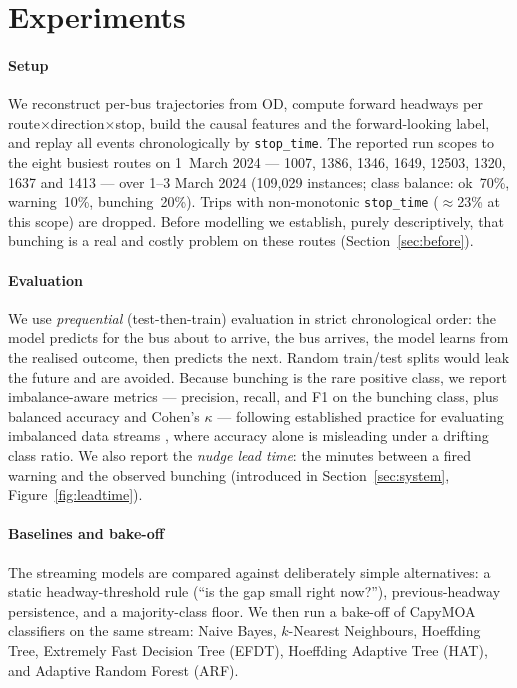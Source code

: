 \documentclass[11pt,a4paper]{article}
\begin{document}
\section{Experiments}
\label{sec:experiments}

\paragraph{Setup}
We reconstruct per-bus trajectories from OD, compute forward headways per
route$\times$direction$\times$stop, build the causal features and the forward-looking label,
and replay all events chronologically by \texttt{stop\_time}. The reported run scopes to the
eight busiest routes on 1~March 2024 --- 1007, 1386, 1346, 1649, 12503, 1320, 1637 and 1413 ---
over 1--3 March 2024 (109{,}029 instances; class balance: ok~70\%, warning~10\%, bunching~20\%).
Trips with non-monotonic \texttt{stop\_time} ($\approx$23\% at this scope) are dropped.
Before modelling we establish, purely descriptively, that bunching is a real and costly problem
on these routes (Section~\ref{sec:before}).

\paragraph{Evaluation}
We use \emph{prequential} (test-then-train) evaluation in strict chronological order: the model
predicts for the bus about to arrive, the bus arrives, the model learns from the realised
outcome, then predicts the next. Random train/test splits would leak the future and are avoided.
Because bunching is the rare positive class, we report imbalance-aware metrics --- precision,
recall, and F1 on the bunching class, plus balanced accuracy and Cohen's $\kappa$ --- following
established practice for evaluating imbalanced data streams \citep{Aguiar2024}, where accuracy
alone is misleading under a drifting class ratio. We also report the
\emph{nudge lead time}: the minutes between a fired warning and the observed bunching
(introduced in Section~\ref{sec:system}, Figure~\ref{fig:leadtime}).

\paragraph{Baselines and bake-off}
The streaming models are compared against deliberately simple alternatives: a static
headway-threshold rule (``is the gap small right now?''), previous-headway persistence, and a
majority-class floor. We then run a bake-off of CapyMOA classifiers on the same stream:
Naive Bayes, $k$-Nearest Neighbours, Hoeffding Tree, Extremely Fast Decision Tree (EFDT),
Hoeffding Adaptive Tree (HAT), and Adaptive Random Forest (ARF).
\end{document}
